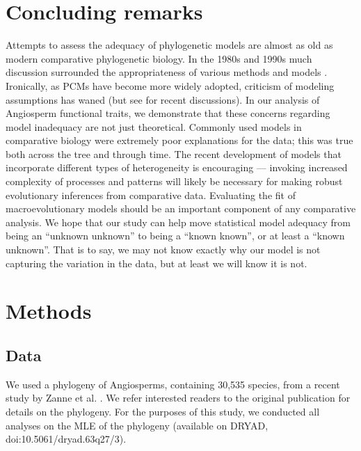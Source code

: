\documentclass[a4paper,12pt]{article}
\begin{document}
\section{Concluding remarks}
Attempts to assess the adequacy of phylogenetic models are almost as old as modern comparative phylogenetic biology.  In the 1980s and 1990s much discussion surrounded the appropriateness of various methods and models \citep{Felsenstein1985, Felsenstein1988, HarveyPagel1991, Garland1992, Diaz1996, Price1997, Garland1999, GarlandIves2000}. Ironically, as PCMs have become more widely adopted, criticism of modeling assumptions has waned (but see \citep{Felsenstein2012, Hansen2012} for recent discussions). In our analysis of Angiosperm functional traits, we demonstrate that these concerns regarding model inadequacy are not just theoretical. Commonly used models in comparative biology were extremely poor explanations for the data; this was true both across the tree and through time. The recent development of models that incorporate different types of heterogeneity is encouraging --- invoking increased complexity of processes and patterns will likely be necessary for making robust evolutionary inferences from comparative data. Evaluating the fit of macroevolutionary models should be an important component of any comparative analysis. We hope that our study can help move statistical model adequacy from being an ``unknown unknown''  to being a ``known known'', or at least a ``known unknown''. That is to say, we may not know exactly why our model is not capturing the variation in the data, but at least we will know it is not.

\section{Methods}

\subsection{Data}
We used a phylogeny of Angiosperms, containing 30,535 species, from a recent study by Zanne et al. \citep{Zanne2013}. We refer interested readers to the original publication for details on the phylogeny. For the purposes of this study, we conducted all analyses on the MLE of the phylogeny (available on DRYAD, doi:10.5061/dryad.63q27/3).
\end{document}

